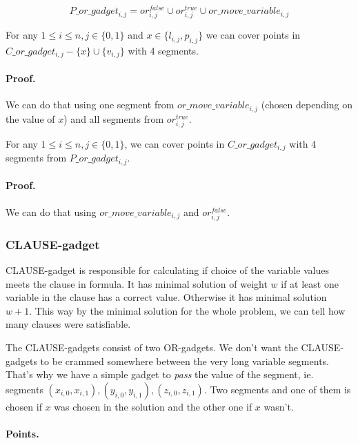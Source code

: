 $$P\_or\_gadget_{i, j} = 
  or^{false}_{i, j} \cup or^{true}_{i, j} \cup or\_move\_variable_{i, j}
  $$


\begin{lemma}
\label{cover_or_true}
For any $1 \le i \le n, j \in \{0, 1\}$ and 
 $x \in \{l_{i, j}, p_{i, j}\}$ we can cover points in
$C\_or\_gadget_{i, j} - \{ x\} \cup \{v_{i, j}\}$
with 4 segments.
\end{lemma}

\paragraph{Proof.}
We can do that using one segment from
$or\_move\_variable_{i, j}$
(chosen depending on the value of $x$)
and all segments from $or^{true}_{i, j}$.

\begin{lemma}
\label{cover_or_false}
For any $1 \le i \le n, j \in \{0, 1\}$, we can cover points in
$C\_or\_gadget_{i, j}$ with 4 segments from $P\_or\_gadget_{i,j}$.
\end{lemma}
\paragraph{Proof.}
We can do that using  $or\_move\_variable_{i, j}$
and $or^{false}_{i, j}$.


\subsubsection{CLAUSE-gadget}


CLAUSE-gadget is responsible for calculating if choice of the
variable values meets the clause in formula.
It has minimal solution of weight $w$ if at least one variable
in the clause has a correct value.
Otherwise it has minimal solution $w+1$.
This way by the minimal solution for the whole problem, we can tell
how many clauses were satisfiable.

The CLAUSE-gadgets consist of two OR-gadgets.
We don't want the CLAUSE-gadgets to be crammed 
somewhere between
the very long variable segments. That's why we have a simple
gadget to \textit{pass} the value of the segment, ie. segments
$(x_{i, 0}, x_{i, 1}), (y_{i, 0}, y_{i, 1}), (z_{i, 0}, z_{i, 1})$.
Two segments and one of them is chosen if $x$ was chosen
in the solution and the other one if $x$ wasn't.

\paragraph{Points.}


